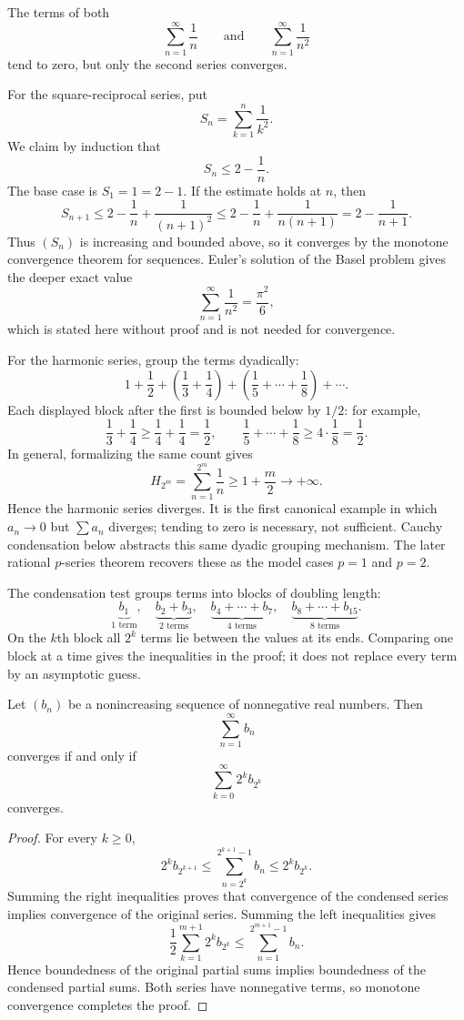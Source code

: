 \begin{example}
The terms of both
\[
\sum_{n=1}^{\infty}\frac1n
\qquad\text{and}\qquad
\sum_{n=1}^{\infty}\frac1{n^2}
\]
tend to zero, but only the second series converges.

For the square-reciprocal series, put
\[
S_n=\sum_{k=1}^n\frac1{k^2}.
\]
We claim by induction that
\[
\boxed{S_n\leq2-\frac1n.}
\]
The base case is \(S_1=1=2-1\). If the estimate holds at \(n\), then
\[
S_{n+1}\leq2-\frac1n+\frac1{(n+1)^2}
\leq2-\frac1n+\frac1{n(n+1)}
=2-\frac1{n+1}.
\]
Thus \((S_n)\) is increasing and bounded above, so it converges by the
monotone convergence theorem for sequences. Euler's solution of the Basel
problem gives the deeper exact value
\[
\boxed{\sum_{n=1}^{\infty}\frac1{n^2}=\frac{\pi^2}{6},}
\]
which is stated here without proof and is not needed for convergence.

For the harmonic series, group the terms dyadically:
\[
1+\frac12+
\left(\frac13+\frac14\right)+
\left(\frac15+\cdots+\frac18\right)+\cdots.
\]
Each displayed block after the first is bounded below by \(1/2\): for
example,
\[
\frac13+\frac14\geq\frac14+\frac14=\frac12,
\qquad
\frac15+\cdots+\frac18\geq4\cdot\frac18=\frac12.
\]
In general, formalizing the same count gives
\[
H_{2^m}=\sum_{n=1}^{2^m}\frac1n\geq1+\frac m2\longrightarrow+\infty.
\]
Hence the harmonic series diverges. It is the first canonical example in
which \(a_n\to0\) but \(\sum a_n\) diverges; tending to zero is necessary,
not sufficient. Cauchy condensation below abstracts this same dyadic
grouping mechanism. The later rational \(p\)-series theorem recovers these
as the model cases \(p=1\) and \(p=2\).
\end{example}

The condensation test groups terms into blocks of doubling length:
\[
\underbrace{b_1}_{1\text{ term}},\quad
\underbrace{b_2+b_3}_{2\text{ terms}},\quad
\underbrace{b_4+\cdots+b_7}_{4\text{ terms}},\quad
\underbrace{b_8+\cdots+b_{15}}_{8\text{ terms}}.
\]
On the $k$th block all $2^k$ terms lie between the values at its ends.
Comparing one block at a time gives the inequalities in the proof; it
does not replace every term by an asymptotic guess.
\begin{theorem}
\label{thm:cauchy-condensation}
Let $(b_n)$ be a nonincreasing sequence of nonnegative real numbers. Then
\[
\sum_{n=1}^{\infty}b_n
\]
converges if and only if
\[
\sum_{k=0}^{\infty}2^k b_{2^k}
\]
converges.
\end{theorem}
\begin{proof}
For every $k\geq0$,
\[
2^k b_{2^{k+1}}
\leq
\sum_{n=2^k}^{2^{k+1}-1}b_n
\leq
2^k b_{2^k}.
\]
Summing the right inequalities proves that convergence of the condensed series implies convergence of the original series. Summing the left inequalities gives
\[
\frac12\sum_{k=1}^{m+1}2^k b_{2^k}
\leq
\sum_{n=1}^{2^{m+1}-1}b_n.
\]
Hence boundedness of the original partial sums implies boundedness of the condensed partial sums. Both series have nonnegative terms, so monotone convergence completes the proof.
\end{proof}

